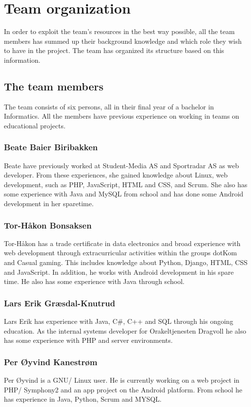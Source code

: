 \section{Team organization}
In order to exploit the team's resources in the best way possible, all the team members has summed up their background knowledge and which role they wish to have in the project. The team has organized its structure based on this information.

\subsection{The team members}
The team consists of six persons, all in their final year of a bachelor in Informatics. All the members have previous experience on working in teams on educational projects.

\subsubsection{Beate Baier Biribakken}
Beate have previously worked at Student-Media AS\cite{studentmedia} and Sportradar AS\cite{sportradar} as web developer. From these experiences, she gained knowledge about Linux, web development, such as PHP, JavaScript, HTML and CSS, and Scrum. She also has some experience with Java and MySQL from school and has done some Android development in her sparetime.

\subsubsection{Tor-Håkon Bonsaksen}
Tor-Håkon has a trade certificate in data electronics and broad experience with web development through extracurricular activities within the groups dotKom\cite{dotkom} and Casual gaming\cite{casualgaming}. This includes knowledge about Python, Django, HTML, CSS and JavaScript. In addition, he works with Android development in his spare time. He also has some experience with Java through school.

\subsubsection{Lars Erik Græsdal-Knutrud}
Lars Erik has experience with Java, C\#, C++ and SQL through his ongoing education. As the internal systems developer for Orakeltjenesten Dragvoll\cite{orakeltjenesten} he also has some experience with PHP and server environments. 

\subsubsection{Per Øyvind Kanestrøm}
Per Øyvind is a GNU/ Linux user. He is currently working on a web project in PHP/ Symphony2 and an app project on the Android platform. From school he has experience in Java, Python, Scrum and MYSQL.

